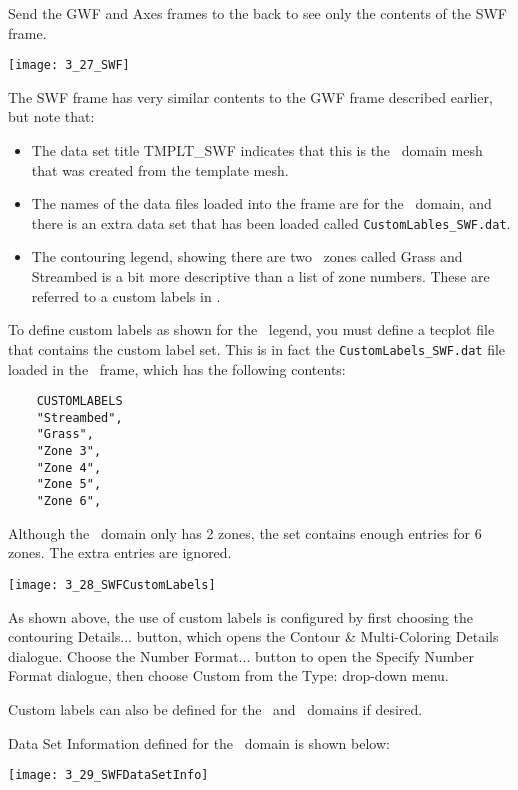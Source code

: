 Send the {\sf GWF} and {\sf Axes} frames to the back to see only the contents of the {\sf SWF} frame.

        \texttt{[image: 3\_27\_SWF]}



The {\sf SWF} frame has very similar contents to the {\sf GWF} frame described earlier, but note that:
\begin{itemize}
  \item   The data set title {\sf TMPLT\_SWF} indicates that this is the \swf\ domain mesh that was created from the template mesh.
  \item The names of the data files loaded into the frame are for the \swf\ domain, and there is an extra data set that has been loaded called {\tt CustomLables\_SWF.dat}.
  \item The contouring legend, showing there are two \swf\ zones called {\sf Grass} and {\sf Streambed} is a bit more descriptive than a list of zone numbers.   These are referred to a custom labels in \tecplot.
\end{itemize}

 To define custom labels as shown for the \swf\ legend, you must define a tecplot file that contains the custom label set.  This is in fact the {\tt CustomLabels\_SWF.dat} file loaded in the \swf\ frame, which has the following contents:
\begin{verbatim}
    CUSTOMLABELS
    "Streambed",
    "Grass",
    "Zone 3",
    "Zone 4",
    "Zone 5",
    "Zone 6",
\end{verbatim}
Although the \swf\ domain only has 2 zones, the set contains enough entries for 6 zones.  The extra entries are ignored.

        \texttt{[image: 3\_28\_SWFCustomLabels]}

As shown above, the use of custom labels is configured by first choosing the contouring {\sf Details...} button, which opens the {\sf Contour \& Multi-Coloring Details} dialogue.  Choose the {\sf Number Format...} button to open the {\sf Specify Number Format} dialogue, then choose {\sf Custom} from the {\sf Type:} drop-down menu.

Custom labels can also be defined for the \gwf\ and \cln\ domains if desired.

{\sf Data Set Information} defined for the \swf\ domain is shown below:

        \texttt{[image: 3\_29\_SWFDataSetInfo]}


